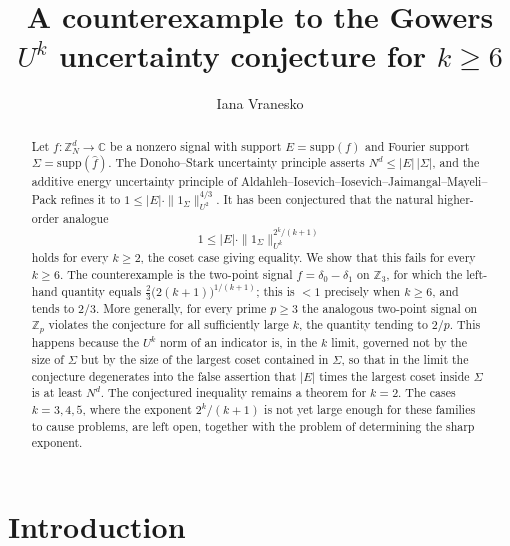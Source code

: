 \documentclass[12pt]{amsart}
\newcommand{\Z}{\mathbb{Z}}
\newcommand{\C}{\mathbb{C}}
\newcommand{\supp}{\mathrm{supp}}
\begin{document}
\pagestyle{fancy}
\fancyhf{}
\lhead{}
\rhead{}
\cfoot{}
\renewcommand{\headrulewidth}{0pt}
\renewcommand{\footrulewidth}{0pt}


\title[A counterexample to the Gowers uncertainty conjecture]{A counterexample to the Gowers $U^k$ uncertainty conjecture for $k\ge 6$}

\author{Iana Vranesko}\address{Department of Mathematics, Brown University, Providence, RI, 02912}

\begin{abstract}
Let $f:\Z_N^d\to\C$ be a nonzero signal with support $E=\supp(f)$ and Fourier support $\Sigma=\supp(\hat f)$. The Donoho--Stark uncertainty principle asserts $N^d\le|E|\,|\Sigma|$, and the additive energy uncertainty principle of Aldahleh--Iosevich--Iosevich--Jaimangal--Mayeli--Pack refines it to $1\le|E|\cdot\|1_\Sigma\|_{U^2}^{4/3}$. It has been conjectured that the natural higher-order analogue
\[
1\le |E|\cdot\|1_\Sigma\|_{U^k}^{2^k/(k+1)}
\]
holds for every $k\ge 2$, the coset case giving equality. We show that this fails for every $k\ge 6$. The counterexample is the two-point signal $f=\delta_0-\delta_1$ on $\Z_3$, for which the left-hand quantity equals $\tfrac23\bigl(2(k+1)\bigr)^{1/(k+1)}$; this is $<1$ precisely when $k\ge 6$, and tends to $2/3$. More generally, for every prime $p\ge 3$ the analogous two-point signal on $\Z_p$ violates the conjecture for all sufficiently large $k$, the quantity tending to $2/p$. This happens because the $U^k$ norm of an indicator is, in the $k$ limit, governed not by the size of $\Sigma$ but by the size of the largest coset contained in $\Sigma$, so that in the limit the conjecture degenerates into the false assertion that $|E|$ times the largest coset inside $\Sigma$ is at least $N^d$. The conjectured inequality remains a theorem for $k=2$. The cases $k=3,4,5$, where the exponent $2^k/(k+1)$ is not yet large enough for these families to cause problems, are left open, together with the problem of determining the sharp exponent.
\end{abstract}

\maketitle



\section{Introduction}
\end{document}
